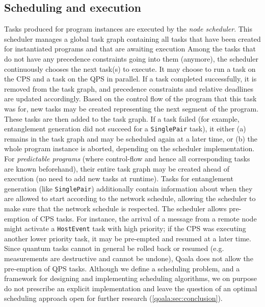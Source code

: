 \subsection{Scheduling and execution}
\label{qoala:sec:scheduling}
Tasks produced for program instances are executed by the \textit{node scheduler}.
This scheduler manages a global task graph containing all tasks that have been created for instantiated programs and that are awaiting execution
Among the tasks that do not have any precedence constraints going into them (anymore), the scheduler continuously chooses the next task(s) to execute.
It may choose to run a task on the CPS and a task on the QPS in parallel.
If a task completed successfully, it is removed from the task graph, and precedence constraints and relative deadlines are updated accordingly.
Based on the control flow of the program that this task was for, new tasks may be created representing the next segment of the program.
These tasks are then added to the task graph.
If a task failed (for example, entanglement generation did not succeed for a \texttt{SinglePair} task), it either (a) remains in the task graph and may be scheduled again at a later time,
or (b) the whole program instance is aborted, depending on the scheduler implementation.
For \textit{predictable programs} (where control-flow and hence all corresponding tasks are known beforehand), their entire task graph may be created ahead of execution (no need to add new tasks at runtime).
Tasks for entanglement generation (like \texttt{SinglePair}) additionally contain information about when they are allowed to start according to the network schedule,
allowing the scheduler to make sure that the network schedule is respected.
The scheduler allows pre-emption of CPS tasks.
For instance, the arrival of a message from a remote node might activate a \texttt{HostEvent} task with high priority;
if the CPS was executing another lower priority task, it may be pre-empted and resumed at a later time.
Since quantum tasks cannot in general be rolled back or resumed (e.g. measurements are destructive and cannot be undone), Qoala does not allow the pre-emption of QPS tasks.
Although we define a scheduling problem, and a framework for designing and implementing scheduling algorithms,
we on purpose do not prescribe an explicit implementation and leave the question of an optimal scheduling approach open for further research (\cref{qoala:sec:conclusion}).
